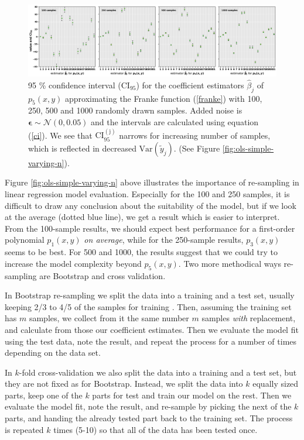 \documentclass[]{article}
\begin{document}
\begin{figure}[!htb]
\centering
\includegraphics[width=1\linewidth]{./results/ols-ci95.png}
\caption{95 \% confidence interval ($\mathrm{CI_{95}}$) for the coefficient estimators $\hat{\beta}_j$ of $p_5(x,y)$ approximating the Franke function (\ref{franke}) with 100, 250, 500 and 1000 randomly drawn samples. Added noise is $\mathbf{\epsilon} \sim \mathcal{N}(0, 0.05)$ and the intervals are calculated using equation (\ref{ci}). We see that $\mathrm{CI_{95}^{(j)}}$ narrows for increasing number of samples, which is reflected in decreased $\mathrm{Var}(\tilde{y}_j)$. (See Figure \ref{fig:ols-simple-varying-n}).}
\label{fig:ols-ci95}
\end{figure}

Figure \ref{fig:ols-simple-varying-n} above illustrates the importance of re-sampling in linear regression model evaluation. Especially for the 100 and 250 samples, it is difficult to draw any conclusion about the suitability of the model, but if we look at the average (dotted blue line), we get a result which is easier to interpret. From the 100-sample results, we should expect best performance for a first-order polynomial $p_1(x,y)$ \textit{on average}, while for the 250-sample results, $p_3(x,y)$ seems to be best. For 500 and 1000, the results suggest that we could try to increase the model complexity beyond $p_5(x,y)$. Two more methodical ways re-sampling are Bootstrap and cross validation.

In Bootstrap re-sampling we split the data into a training and a test set, usually keeping 2/3 to 4/5 of the samples for training \cite{assignment}. Then, assuming the training set has $m$ samples, we collect from it the same number $m$ samples \textit{with} replacement, and calculate from those our coefficient estimates. Then we evaluate the model fit using the test data, note the result, and repeat the process for a number of times depending on the data set.

In $k$-fold cross-validation we also split the data into a training and a test set, but they are not fixed as for Bootstrap. Instead, we split the data into $k$ equally sized parts, keep one of the $k$ parts for test and train our model on the rest. Then we evaluate the model fit, note the result, and re-sample by picking the next of the $k$ parts, and handing the already tested part back to the training set. The process is repeated $k$ times (5-10) \cite{assignment} so that all of the data has been tested once.
\end{document}
